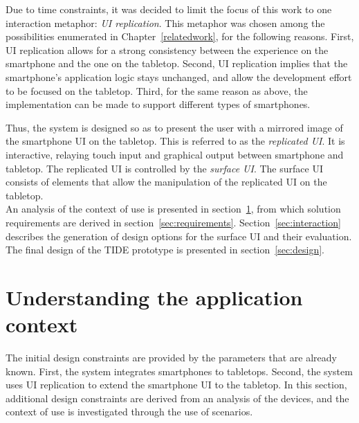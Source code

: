 Due to time constraints, it was decided to limit the focus of this work to one interaction metaphor: \emph{UI replication}.
This metaphor was chosen among the possibilities enumerated in Chapter~\ref{relatedwork}, for the following reasons.
First, UI replication allows for a strong consistency between the experience on the smartphone and the one on the tabletop.
Second, UI replication implies that the smartphone's application logic stays unchanged, and allow the development effort to be focused on the tabletop.
Third, for the same reason as above, the implementation can be made to support different types of smartphones.

Thus, the system is designed so as to present the user with a mirrored image of the smartphone UI on the tabletop.
This is referred to as the \emph{replicated UI}.
It is interactive, relaying touch input and graphical output between smartphone and tabletop.
The replicated UI is controlled by the \emph{surface UI}.
The surface UI consists of elements that allow the manipulation of the replicated UI on the tabletop.
\\
\linebreak
An analysis of the context of use is presented in section~\ref{sec:context}, from which solution requirements are derived in section~\ref{sec:requirements}.
Section~\ref{sec:interaction} describes the generation of design options for the surface UI and their evaluation.
The final design of the TIDE prototype is presented in section~\ref{sec:design}.

\section{Understanding the application context}
\label{sec:context}

The initial design constraints are provided by the parameters that are already known.
First, the system integrates smartphones to tabletops.
Second, the system uses UI replication to extend the smartphone UI to the tabletop.
In this section, additional design constraints are derived from an analysis of the devices, and the context of use is investigated through the use of scenarios.



